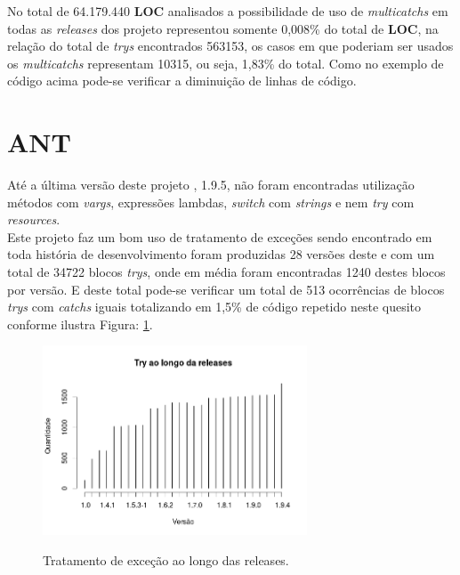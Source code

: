 No total de 64.179.440 \textbf{LOC} analisados a possibilidade de uso de \textit{multicatchs} em todas as \textit{releases} dos projeto representou somente 0,008\% do total de \textbf{LOC}, na relação do total de \textit{trys} encontrados 563153, os casos em que poderiam ser usados os \textit{multicatchs} representam 10315, ou seja, 1,83\% do total. Como no exemplo de código acima pode-se verificar a diminuição de linhas de código.\\

\section{ANT}
Até a última versão deste projeto \cite{apacheAnt}, 1.9.5, não foram encontradas utilização métodos com \textit{vargs}, expressões lambdas, \textit{switch} com \textit{strings} e nem \textit{try} com \textit{resources}.\\

Este projeto faz um bom uso de tratamento de exceções sendo encontrado em toda história de desenvolvimento foram produzidas 28 versões deste e com um total de 34722 blocos \textit{trys}, onde em média foram encontradas 1240 destes blocos por versão. E deste total pode-se verificar um total de 513 ocorrências de blocos \textit{trys} com \textit{catchs} iguais totalizando em 1,5\% de código repetido neste quesito conforme ilustra Figura: \ref{fig:TrysAnt}.\\

\begin{figure}[h]
	\center
	\includegraphics[width=0.7\textwidth]{Imagens/trysAnt}
	\label{fig:TrysAnt}
	\caption{Tratamento de exceção ao longo das releases.}
\end{figure}

